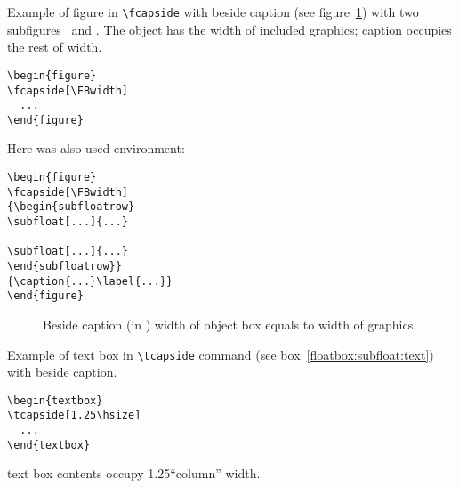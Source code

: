 \ifLoadSubfig

Example of figure in \verb|\fcapside| with beside caption (see figure~\ref{floatbox:beside:fig})
with two subfigures~ and . The object has the width of included graphics;
caption occupies the rest of width.
\begin{verbatim}
\begin{figure}
\fcapside[\FBwidth]
  ...
\end{figure}
\end{verbatim}
Here was also used  environment:
\begin{verbatim}
\begin{figure}
\fcapside[\FBwidth]
{\begin{subfloatrow}
\subfloat[...]{...}

\subfloat[...]{...}
\end{subfloatrow}}
{\caption{...}\label{...}}
\end{figure}
\end{verbatim}

\begin{figure}
{\caption{Beside caption (in \protect{}) width of object box equals to width of
graphics. \text}%
\label{floatbox:beside:fig}}
\end{figure}

\Text

\fi

\clearpage
Example of text box in \verb|\tcapside| command (see box~\ref{floatbox:subfloat:text}) with beside caption.
\begin{verbatim}
\begin{textbox}
\tcapside[1.25\hsize]
  ...
\end{textbox}
\end{verbatim}
text box contents occupy 1.25``column'' width.

\begin{textbox}
\tcapside[1.25\hsize]
{\TEXTBOX}
{\caption{Beside caption  (in \protect{}). The width of object equals
to 1.25``column'' width. \text}%
\label{floatbox:beside:text}}
\end{textbox}


\Text

